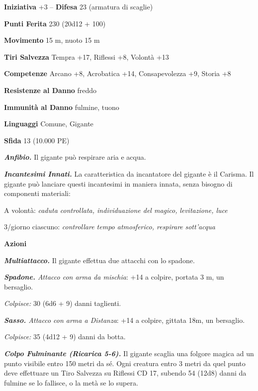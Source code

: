 \begin{multicols}{2}
\textbf{Iniziativa} +3 -- \textbf{Difesa} 23 (armatura di scaglie)

\textbf{Punti Ferita} 230 (20d12 + 100)

\textbf{Movimento} 15 m, nuoto 15 m

\textbf{Tiri Salvezza} Tempra +17, Riflessi +8, Volontà +13

\textbf{Competenze} Arcano +8, Acrobatica +14, Consapevolezza +9, Storia +8

\textbf{Resistenze al Danno} freddo

\textbf{Immunità al Danno} fulmine, tuono

\textbf{Linguaggi} Comune, Gigante

\textbf{Sfida} 13 (10.000 PE)

\emph{\textbf{Anfibio.}} Il gigante può respirare aria e acqua.

\emph{\textbf{Incantesimi Innati.}} La caratteristica da incantatore del gigante è il Carisma. Il gigante può lanciare questi incantesimi in maniera innata, senza bisogno di componenti materiali:

A volontà: \emph{caduta controllata, individuazione del magico,} \emph{levitazione, luce}

3/giorno ciascuno: \emph{controllare tempo atmosferico, respirare} \emph{sott'acqua}

\textbf{Azioni}

\emph{\textbf{Multiattacco.}} Il gigante effettua due attacchi con lo spadone.

\emph{\textbf{Spadone.} Attacco con arma da mischia}: +14 a colpire, portata 3 m, un bersaglio.

\emph{Colpisce:} 30 (6d6 + 9) danni taglienti.

\emph{\textbf{Sasso.} Attacco con arma a Distanza}: +14 a colpire, gittata 18m, un bersaglio.

\emph{Colpisce:} 35 (4d12 + 9) danni da botta.

\emph{\textbf{Colpo Fulminante (Ricarica 5-6).}} Il gigante scaglia una folgore magica ad un punto visibile entro 150 metri da sé. Ogni creatura entro 3 metri da quel punto deve effettuare un Tiro Salvezza su Riflessi CD 17, subendo 54 (12d8) danni da fulmine se lo fallisce, o la metà se lo supera.


\end{multicols}
